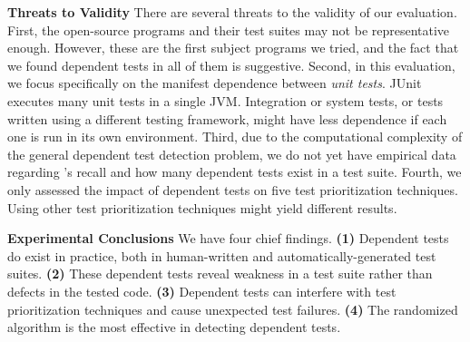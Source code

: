 
\tinyrelax

\noindent \textbf{Threats to Validity}
There are several threats to the validity of our evaluation.
First, the \subjnum open-source
programs and their test suites may not be
representative enough. 
However, these are the first \subjnum subject programs
we tried, and the fact that we found dependent tests
in all of them is suggestive.
Second, in this evaluation, we focus specifically on
the {manifest dependence} between \textit{unit tests}.
JUnit executes many unit tests in a single JVM\@.
Integration or system tests, or tests written using a different testing
framework, might have less dependence if
each one is run in its own environment.
Third, due to the computational complexity of the general dependent test
detection problem, we do not yet have
empirical data regarding \ourtool's recall and how many dependent
tests exist in a test suite. 
Fourth, we only assessed the
impact of dependent tests on five test prioritization
techniques.
Using other test prioritization techniques
might yield different results. 


\tinyrelax

\noindent \textbf{Experimental Conclusions}
We have four chief findings. \textbf{(1)}
Dependent tests do exist in practice, both in
human-written and automatically-generated test suites.
\textbf{(2)} These dependent tests reveal weakness
in a test suite rather than defects in the tested code.
\textbf{(3)} Dependent tests can interfere with
test prioritization techniques and cause unexpected test failures.
\textbf{(4)} 
The randomized algorithm is the most effective in
detecting dependent tests.


